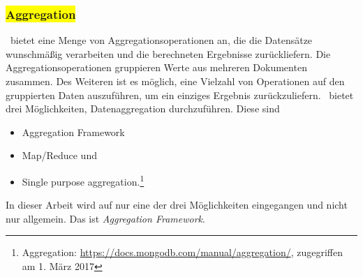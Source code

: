 %
%
%
%
%
%

\subsubsection{\colorbox{yellow}{Aggregation}}\label{aggr}
\mongo\ bietet eine Menge von Aggregationsoperationen an, die die Datensätze wunschmäßig verarbeiten und die berechneten Ergebnisse zurückliefern. Die Aggregationsoperationen gruppieren Werte aus mehreren Dokumenten zusammen. Des Weiteren ist es möglich, eine Vielzahl von Operationen auf den gruppierten Daten auszuführen, um ein einziges Ergebnis zurückzuliefern. \mongo\ bietet drei Möglichkeiten, Datenaggregation durchzuführen. Diese sind 
\begin{itemize}
\item Aggregation Framework
\item Map/Reduce und
\item Single purpose aggregation.\footnote{Aggregation: \url{https://docs.mongodb.com/manual/aggregation/}, zugegriffen am 1. März 2017}
\end{itemize}
In dieser Arbeit wird auf nur eine der drei Möglichkeiten eingegangen und nicht nur allgemein. Das ist \textit{Aggregation Framework}.

